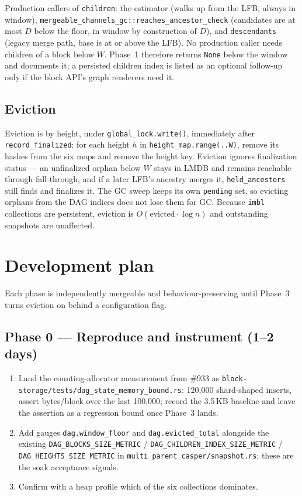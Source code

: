 \documentclass[11pt]{article}
\newcommand{\code}[1]{\texttt{#1}}
\begin{document}
Production callers of \code{children}: the estimator (walks up from the LFB,
always in window), \code{mergeable\_channels\_gc::reaches\_ancestor\_check}
(candidates are at most $D$ below the floor, in window by construction of
$D$), and \code{descendants} (legacy merge path, base is at or above the
LFB). No production caller needs children of a block below $W$. Phase~1
therefore returns \code{None} below the window and documents it; a persisted
children index is listed as an optional follow-up only if the block API's
graph renderers need it.

\subsection{Eviction}

Eviction is by height, under \code{global\_lock.write()}, immediately after
\code{record\_finalized}: for each height $h$ in
\code{height\_map.range(..W)}, remove its hashes from the six maps and remove
the height key. Eviction ignores finalization status --- an unfinalized orphan
below $W$ stays in LMDB and remains reachable through fall-through, and if a
later LFB's ancestry merges it, \code{held\_ancestors} still finds and
finalizes it. The GC sweep keeps its own \code{pending} set, so evicting
orphans from the DAG indices does not lose them for GC. Because \code{imbl}
collections are persistent, eviction is $O(\text{evicted} \cdot \log n)$ and
outstanding snapshots are unaffected.

\section{Development plan}

Each phase is independently mergeable and behaviour-preserving until Phase~3
turns eviction on behind a configuration flag.

\subsection*{Phase 0 --- Reproduce and instrument (1--2 days)}
\begin{enumerate}
\item Land the counting-allocator measurement from \#933 as
  \code{block-storage/tests/dag\_state\_memory\_bound.rs}: 120{,}000
  shard-shaped inserts, assert bytes/block over the last 100{,}000; record the
  3.5\,KB baseline and leave the assertion as a regression bound once
  Phase~3 lands.
\item Add gauges \code{dag.window\_floor} and \code{dag.evicted\_total}
  alongside the existing \code{DAG\_BLOCKS\_SIZE\_METRIC} /
  \code{DAG\_CHILDREN\_INDEX\_SIZE\_METRIC} / \code{DAG\_HEIGHTS\_SIZE\_METRIC}
  in \code{multi\_parent\_casper/snapshot.rs}; these are the soak acceptance
  signals.
\item Confirm with a heap profile which of the six collections dominates.
\end{enumerate}
\end{document}
